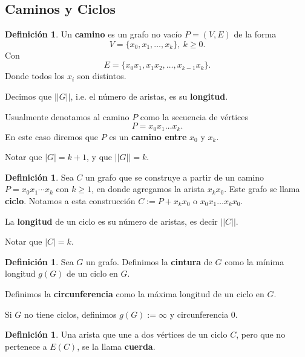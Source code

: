 \documentclass[12pt]{report}
\theoremstyle{plain}
\theoremstyle{definition}
\newtheorem{definition}[theorem]{Definición}
\newenvironment{Definition}{\colorlet{shadecolor}{Apricot!12} \begin{shaded} \begin{definition} }{ \end{definition} \end{shaded} }
\newcommand{\abs}[1]{\left \vert #1 \right \vert}
\newcommand{\Abs}[1]{\left \vert \left \vert #1 \right \vert \right \vert}
\begin{document}
\subsection{Caminos y Ciclos}

\begin{Definition}
Un \textbf{camino} es un grafo no vacío $P = (V,E)$ de la forma
$$
V = \{ x_0,x_1,\ldots,x_k\}, \ k \geq 0.
$$
Con
$$
E = \{ x_0x_1, x_1x_2,\ldots,x_{k-1} x_k\}.
$$
Donde todos los $x_i$ son distintos.

Decimos que $\Abs G$, i.e. el número de aristas, es su \textbf{longitud}.

Usualmente denotamos al camino $P$ como la secuencia de vértices
$$
P = x_0 x_1 \ldots x_k.
$$
En este caso diremos que $P$ es un \textbf{camino entre} $x_0$ y $x_k$.
\end{Definition}

Notar que $\abs G = k+1$, y que $\Abs G = k$.




\begin{definition}
Sea $C$ un grafo que se construye a partir de un camino $P = x_0x_1\cdots x_k$ con $k \geq 1$, en donde agregamos la arista $x_kx_0$. Este grafo se llama \textbf{ciclo}. Notamos a esta construcción $C:= P + x_k x_0$ o $x_0 x_1 \ldots x_k x_0$.

La \textbf{longitud} de un ciclo es su número de aristas, es decir $\Abs C$.
\end{definition}
Notar que $\abs C = k$.


\begin{definition}
Sea $G$ un grafo. Definimos la \textbf{cintura} de $G$ como la mínima longitud $g(G)$ de un ciclo en $G$.

Definimos la \textbf{circunferencia} como la máxima longitud de un ciclo en $G$.
\end{definition}

Si $G$ no tiene ciclos, definimos $g(G):= \infty$ y circunferencia $0$.



\begin{definition}
Una arista que une a dos vértices de un ciclo $C$, pero que no pertenece a $E(C)$, se la llama \textbf{cuerda}.
\end{definition}

\end{document}

